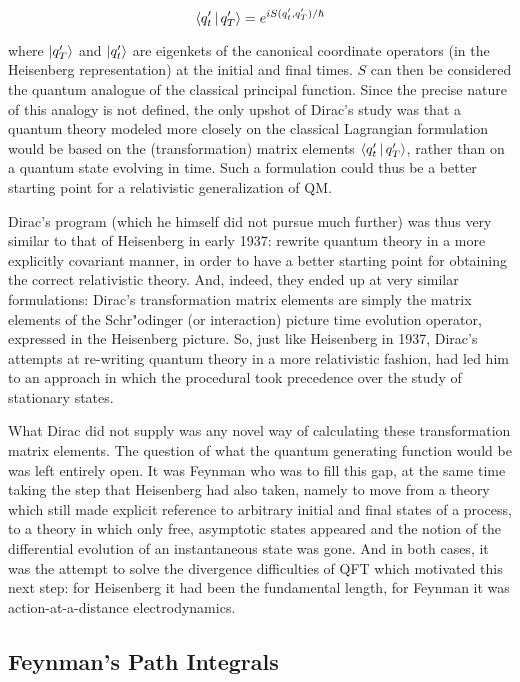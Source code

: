 \documentclass[12pt,a4paper]{article}
\begin{document}
\begin{equation}
\Braket{q_t' | q_T' } = e^{i S(q_t', q_T') / \hbar}
\end{equation}

where $\ket{q_T'}$ and $\ket{q_t'}$ are eigenkets of the canonical coordinate operators (in the Heisenberg representation) at the initial and final times. $S$ can then be considered the quantum analogue of the classical principal function. Since the precise nature of this analogy is not defined, the only upshot of Dirac's study was that a quantum theory modeled more closely on the classical Lagrangian formulation would be based on the (transformation) matrix elements $\Braket{q_t' | q_T' }$, rather than on a quantum state evolving in time. Such a formulation could thus be a better starting point for a relativistic generalization of QM.

Dirac's program (which he himself did not pursue much further) was thus very similar to that of Heisenberg in early 1937: rewrite quantum theory in a more explicitly covariant manner, in order to have a better starting point for obtaining the correct relativistic theory. And, indeed, they ended up at very similar formulations: Dirac's transformation matrix elements are simply the matrix elements of the Schr"odinger (or interaction) picture time evolution operator, expressed in the Heisenberg picture. So, just like Heisenberg in 1937, Dirac's attempts at re-writing quantum theory in a more relativistic fashion, had led him to an approach in which the procedural took precedence over the study of stationary states.

What Dirac did not supply was any novel way of calculating these transformation matrix elements. The question of what the quantum generating function would be was left entirely open. It was Feynman who was to fill this gap, at the same time taking the step that Heisenberg had also taken, namely to move from a theory which still made explicit reference to arbitrary initial and final states of a process, to a theory in which only free, asymptotic states appeared and the notion of the differential evolution of an instantaneous state was gone. And in both cases, it was the attempt to solve the divergence difficulties of QFT which motivated this next step: for Heisenberg it had been the fundamental length, for Feynman it was action-at-a-distance electrodynamics.


\subsection{Feynman's Path Integrals}
\end{document}
